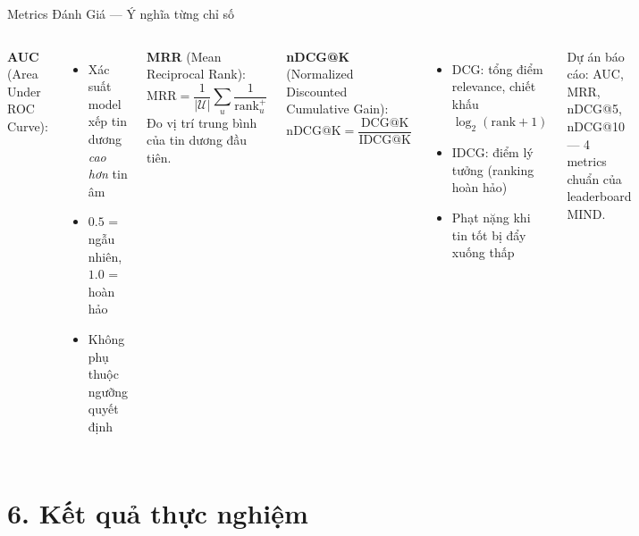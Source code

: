 \documentclass[aspectratio=169,11pt]{beamer}
\begin{document}
\begin{frame}{Metrics Đánh Giá --- Ý nghĩa từng chỉ số}
  \begin{columns}[T]
      \textbf{AUC} (Area Under ROC Curve):
      \begin{itemize}
        \item Xác suất model xếp tin dương \textit{cao hơn} tin âm
        \item $0.5$ = ngẫu nhiên, $1.0$ = hoàn hảo
        \item Không phụ thuộc ngưỡng quyết định
      \end{itemize}

      \vspace{0.3em}
      \textbf{MRR} (Mean Reciprocal Rank):
      \[
        \text{MRR} = \frac{1}{|\mathcal{U}|}\sum_u \frac{1}{\text{rank}^+_u}
      \]
      Đo vị trí trung bình của tin dương đầu tiên.

      \textbf{nDCG@K} (Normalized Discounted Cumulative Gain):
      \[
        \text{nDCG@K} = \frac{\text{DCG@K}}{\text{IDCG@K}}
      \]
      \begin{itemize}
        \item DCG: tổng điểm relevance, chiết khấu $\log_2(\text{rank}+1)$
        \item IDCG: điểm lý tưởng (ranking hoàn hảo)
        \item Phạt nặng khi tin tốt bị đẩy xuống thấp
      \end{itemize}

      \vspace{0.3em}
      \begin{keybox}[]
        \footnotesize
        Dự án báo cáo: AUC, MRR,
        nDCG@5, nDCG@10\\
        --- 4 metrics chuẩn của leaderboard MIND.
      \end{keybox}
  \end{columns}
\end{frame}

\section{6. Kết quả thực nghiệm}
\end{document}

